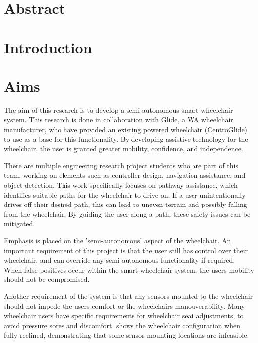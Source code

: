 \documentclass[12pt]{article}
\begin{document}

\thispagestyle{empty}
\pagebreak

\section*{Abstract}
\pagebreak

\renewcommand{\contentsname}{Table of Contents}
\tableofcontents
\listoffigures
\listoftables
\pagebreak

\section{Introduction}
\pagebreak

\section{Aims}
The aim of this research is to develop a semi-autonomous smart wheelchair system.
This research is done in collaboration with Glide, a WA wheelchair manufacturer,
who have provided an existing powered wheelchair (CentroGlide) to use as a base
for this functionality. By developing assistive technology for the wheelchair,
the user is granted greater mobility, confidence, and independence.

There are multiple engineering research project students who are part of this team,
working on elements such as controller design, navigation assistance, and object detection.
This work specifically focuses on pathway assistance, which identifies suitable
paths for the wheelchair to drive on. If a user unintentionally drives off their desired path,
this can lead to uneven terrain and possibly falling from the wheelchair.
By guiding the user along a path, these safety issues can be mitigated.

Emphasis is placed on the 'semi-autonomous' aspect of the wheelchair.
An important requirement of this project is that the user still
has control over their wheelchair, and can override any semi-autonomous functionality
if required. When false positives occur within the smart wheelchair system,
the users mobility should not be compromised.

Another requirement of the system is that any sensors mounted to the wheelchair
should not impede the users comfort or the wheelchairs manouverability.
Many wheelchair users have specific requirements for wheelchair seat adjustments,
to avoid pressure sores and discomfort.  shows the
wheelchair configuration when fully reclined, demonstrating that some sensor mounting locations
are infeasible.
\end{document}
